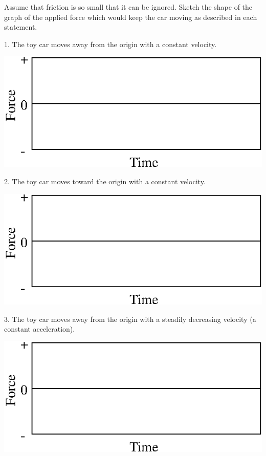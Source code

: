 Assume that friction is so small that it can be ignored. Sketch the shape of
the graph of the applied force which would keep the car moving as described
in each statement.

1. The toy car moves away from the origin with a constant velocity.

\vspace{0.3cm}
{\par\centering \includegraphics{force2/force2_fig7.eps} \par}
\vspace{0.3cm}

2. The toy car moves toward the origin with a constant velocity.

\vspace{0.3cm}
{\par\centering \includegraphics{force2/force2_fig7.eps} \par}
\vspace{0.3cm}

3. The toy car moves away from the origin with a steadily decreasing velocity
(a constant acceleration).

\vspace{0.3cm}
{\par\centering \includegraphics{force2/force2_fig7.eps} \par}
\vspace{0.3cm}

